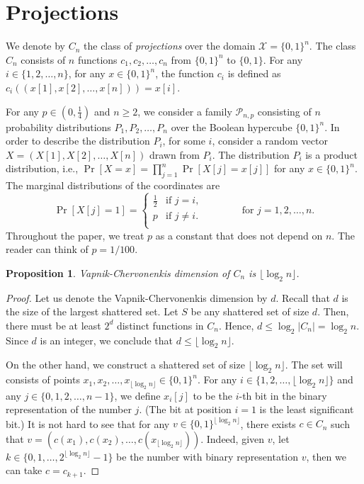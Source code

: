 \documentclass[10pt]{article}
\newtheorem{proposition}{Proposition}
\renewcommand{\P}{\mathcal{P}}
\newcommand{\X}{\mathcal{X}}
\begin{document}
\section{Projections}

We denote by $C_n$ the class of \emph{projections} over the domain $\X = \{0,1\}^n$. The
class $C_n$ consists of $n$ functions $c_1, c_2, \dots, c_n$ from $\{0,1\}^n$ to
$\{0,1\}$. For any $i \in \{1,2,\dots,n\}$, for any $x \in \{0,1\}^n$,
the function $c_i$ is defined as $c_i((x[1], x[2], \dots, x[n])) = x[i]$.

For any $p \in (0,\frac{1}{4})$ and $n \ge 2$, we consider a family $\P_{n,p}$
consisting of $n$ probability distributions $P_1, P_2, \dots, P_n$ over the
Boolean hypercube $\{0,1\}^n$. In order to describe the distribution $P_i$, for
some $i$, consider a random vector $X = (X[1], X[2], \dots, X[n])$ drawn from
$P_i$. The distribution $P_i$ is a product distribution, i.e., $\Pr[X = x] =
\prod_{j=1}^n \Pr[X[j] = x[j]]$ for any $x \in \{0,1\}^n$. The marginal
distributions of the coordinates are
$$
\Pr[X[j] = 1] =
\begin{cases}
\frac{1}{2} & \text{if $j = i$,} \\
p & \text{if $j\neq i$.} \\
\end{cases}
\qquad \qquad \text{for $j=1,2,\dots,n$.}
$$
Throughout the paper, we treat $p$ as a constant that does not depend
on $n$. The reader can think of $p=1/100$.

\begin{proposition}
\label{proposition:vc-dimension-projections}
Vapnik-Chervonenkis dimension of $C_n$ is $\lfloor \log_2 n \rfloor$.
\end{proposition}

\begin{proof}
Let us denote the Vapnik-Chervonenkis dimension by $d$. Recall that $d$ is the
size of the largest shattered set. Let $S$ be any shattered set of size $d$.
Then, there must be at least $2^d$ distinct functions in $C_n$. Hence, $d \le
\log_2 |C_n| = \log_2 n$. Since $d$ is an integer, we conclude that $d \le
\lfloor \log_2 n \rfloor$.

On the other hand, we construct a shattered set of size $\lfloor \log_2 n
\rfloor$. The set will consists of points $x_1, x_2, \dots, x_{\lfloor \log_2 n
\rfloor} \in \{0,1\}^n$. For any $i \in \{1,2,\dots,\lfloor \log_2 n \rfloor\}$
and any $j \in \{0,1,2,\dots,n-1\}$, we define $x_i[j]$ to be the $i$-th bit
in the binary representation of the number $j$. (The bit at position $i=1$ is the
least significant bit.) It is not hard to see that for any $v \in
\{0,1\}^{\lfloor \log_2 n \rfloor}$, there exists $c \in C_n$ such that $v =
(c(x_1), c(x_2), \dots, c(x_{\lfloor \log_2 n \rfloor}))$. Indeed, given $v$,
let $k \in \{0,1,\dots,2^{\lfloor \log_2 n \rfloor} - 1\}$ be the number with
binary representation $v$, then we can take $c = c_{k+1}$.
\end{proof}
\end{document}
